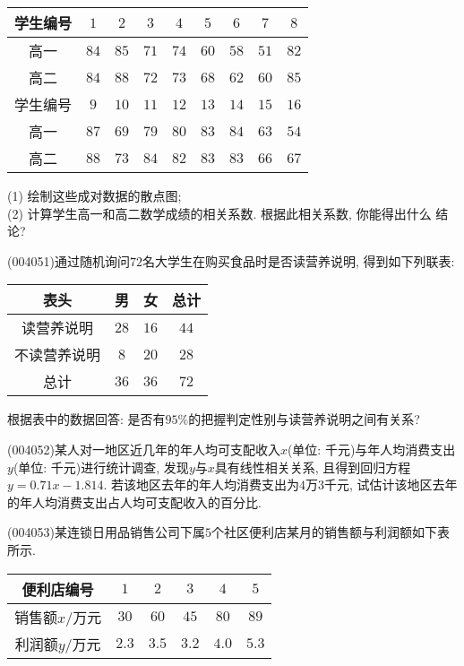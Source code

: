 \begin{center}
    \begin{tabular}{|c|c|c|c|c|c|c|c|c|}
        \hline
        学生编号& $1$ & $2$ & $3$ & $4$ & $5$ & $6$ & $7$ & $8$ \\ \hline 
        高一& $84$ & $85$ & $71$ & $74$ & $60$ & $58$ & $51$ & $82$ \\ \hline 
        高二& $84$ & $88$ & $72$ & $73$ & $68$ & $62$ & $60$ & $85$ \\ \hline \hline
        学生编号& $9$ & $10$ & $11$ & $12$ & $13$ & $14$ & $15$ & $16$ \\ \hline 
        高一& $87$ & $69$ & $79$ & $80$ & $83$ & $84$ & $63$ & $54$ \\ \hline 
        高二& $88$ & $73$ & $84$ & $82$ & $83$ & $83$ & $66$ & $67$ \\ \hline
    \end{tabular}
\end{center}
(1) 绘制这些成对数据的散点图;\\
(2) 计算学生高一和高二数学成绩的相关系数. 根据此相关系数, 你能得出什么
结论?
\item (004051)通过随机询问$72$名大学生在购买食品时是否读营养说明, 得到如下列联表:
\begin{center}
    \begin{tabular}{|c|c|c|c|}
        \hline
        表头 & 男 & 女 & 总计\\ \hline 
        读营养说明& $28$& $16$& $44$\\ \hline 
        不读营养说明& $8$& $20$& $28$\\ \hline 
        总计& $36$& $36$& $72$\\ \hline 
    \end{tabular}
\end{center}
根据表中的数据回答: 是否有$95\%$的把握判定性别与读营养说明之间有关系?
\item (004052)某人对一地区近几年的年人均可支配收入$x$(单位: 千元)与年人均消费支出$y$(单位: 千元)进行统计调查, 发现$y$与$x$具有线性相关关系, 且得到回归方程$y=0.71x-1.814$. 若该地区去年的年人均消费支出为$4$万$3$千元, 试估计该地区去年的年人均消费支出占人均可支配收入的百分比.
\item (004053)某连锁日用品销售公司下属$5$个社区便利店某月的销售额与利润额如下表所示.
\begin{center}
    \begin{tabular}{|c|c|c|c|c|c|}
        \hline
        便利店编号 & $1$ & $2$ & $3$ & $4$ & $5$\\ \hline 
        销售额$x/$万元 & $30$ & $60$ & $45$ & $80$ & $89$\\ \hline 
        利润额$y/$万元 & $2.3$ & $3.5$ & $3.2$ & $4.0$ & $5.3$\\ \hline 
    \end{tabular}
\end{center}

